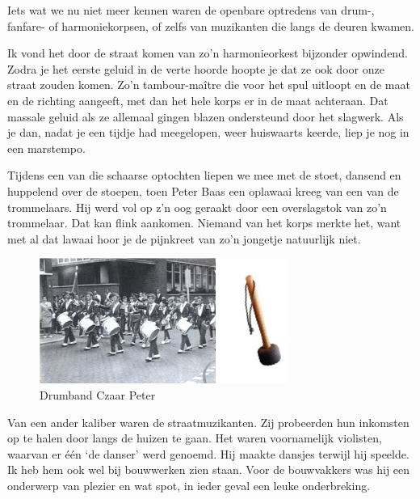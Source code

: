 \documentclass[12pt,twoside, openright]{memoir}
\begin{document}
Iets wat we nu niet meer kennen waren de openbare optredens van drum-, fanfare- of harmoniekorpsen, of zelfs van muzikanten die langs de deuren kwamen. 

Ik vond het door de straat komen van zo’n harmonieorkest bijzonder opwindend. Zodra je het eerste geluid in de verte hoorde hoopte je dat ze ook door onze straat zouden komen. Zo’n tambour-maître die voor het spul uitloopt en de maat en de richting aangeeft, met dan het hele korps er in de maat achteraan. Dat massale geluid als ze allemaal gingen blazen ondersteund door het slagwerk. Als je dan, nadat je een tijdje had meegelopen, weer huiswaarts keerde, liep je nog in een marstempo.

Tijdens een van die schaarse optochten liepen we mee met de stoet, dansend en huppelend over de stoepen, toen Peter Baas een oplawaai kreeg van een van de trommelaars. Hij werd vol op z’n oog geraakt door een overslagstok van zo’n trommelaar. 
Dat kan flink aankomen. Niemand van het korps merkte het, want met al dat lawaai hoor je de pijnkreet van zo’n jongetje natuurlijk niet.

\begin{figure}
\includegraphics[width=\textwidth]{img/ch23/drumband2}
\caption*{\footnotesize Drumband Czaar Peter}
\end{figure}

Van een ander kaliber waren de straatmuzikanten. Zij probeerden hun inkomsten op te halen door langs de huizen te gaan. Het waren voornamelijk violisten, waarvan er één ‘de danser’ werd genoemd. Hij maakte dansjes terwijl hij speelde. Ik heb hem ook wel bij bouwwerken zien staan. Voor de bouwvakkers was hij een onderwerp van plezier en wat spot, in ieder geval een leuke onderbreking.

\end{document}
